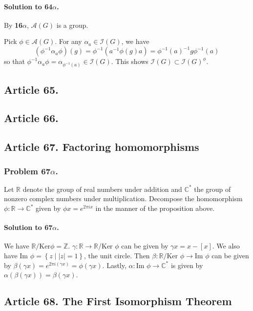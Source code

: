 \paragraph*{Solution to 64$\alpha$.}
By \textbf{16$\alpha$}, $\mathcal{A}(G)$ is a group.

Pick $\phi \in \mathcal{A}(G)$. For any $\alpha_a \in \mathcal{I}(G)$,
we have
$$ (\phi^{-1} \alpha_a \phi)(g) = \phi^{-1}(a^{-1}\phi(g)a)
= \phi^{-1}(a)^{-1} g \phi^{-1}(a) $$
so that $\phi^{-1} \alpha_a \phi = \alpha_{\phi^{-1}(a)} \in \mathcal{I}(G)$.
This shows $\mathcal{I}(G) \subset \mathcal{I}(G)^\phi$.
\subsection{Article 65.}

\subsection{Article 66.}

\subsection{Article 67. Factoring homomorphisms}
\subsubsection{Problem 67$\alpha$.}
Let $\mathbb{R}$ denote the group of real numbers under addition and
$\mathbb{C}^*$ the group of nonzero complex numbers under multiplication.
Decompose the homomorphism $ \phi : \mathbb{R} \rightarrow \mathbb{C}^*$
given by $\phi x = e^{2 \pi i x}$ in the manner of the proposition above.

\paragraph*{Solution to 67$\alpha$.}
We have $\mathbb{R} / \mbox{Ker} \phi = \mathbb{Z}$. $\gamma : \mathbb{R} \rightarrow
\mathbb{R} / \mbox{Ker } \phi $ can be given by $ \gamma x = x - [x] $. We also
have $ \mbox{Im } \phi = \left\{ z \mid |z| = 1\right\}$, the unit circle. Then
$\beta : \mathbb{R} / \mbox{Ker } \phi \rightarrow \mbox{Im } \phi $ can be
given by $ \beta (\gamma x) = e^{2\pi i (\gamma x)} = \phi (\gamma x)$.
Lastly, $\alpha : \mbox{Im } \phi \rightarrow \mathbb{C}^* $ is given by
$ \alpha ( \beta ( \gamma x ) ) = \beta (\gamma x) $.

\subsection{Article 68. The First Isomorphism Theorem}

